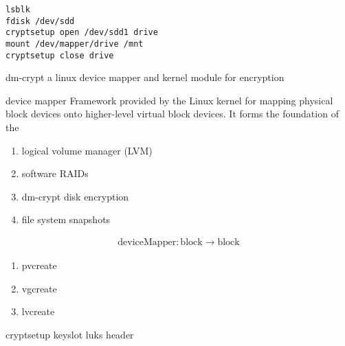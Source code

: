 \documentclass[openany, 12pt]{book}
\begin{document}
\begin{verbatim}
lsblk
fdisk /dev/sdd
cryptsetup open /dev/sdd1 drive
mount /dev/mapper/drive /mnt
cryptsetup close drive
\end{verbatim}

\begin{definition}{dm-crypt}{}
	a linux device mapper and kernel module for encryption
\end{definition}

\begin{definition}{device mapper}{}
	Framework provided by the Linux kernel for mapping physical block devices
	onto higher-level virtual block devices. It forms the foundation of the
	\begin{enumerate}[label = {(\arabic*)}]
		\item logical volume manager (LVM)
		\item software RAIDs
		\item dm-crypt disk encryption
		\item file system snapshots
	\end{enumerate}
	\begin{align*}
		\text{deviceMapper}: \text{block} \to \text{block}
	\end{align*}
\end{definition}

\begin{enumerate}[label = {(\arabic*)}]
	\item pvcreate
	\item vgcreate
	\item lvcreate
\end{enumerate}

cryptsetup
keyslot
luks header
\end{document}
